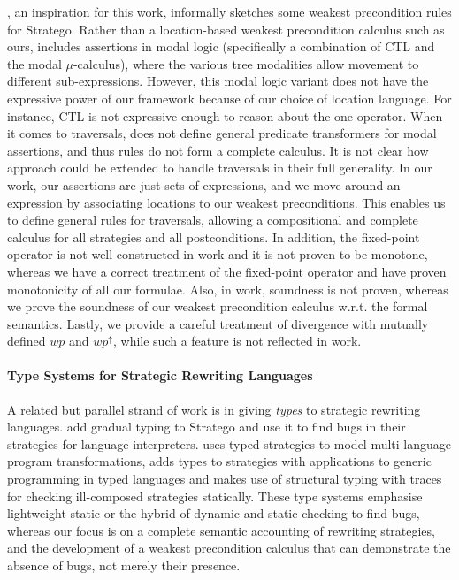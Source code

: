 \citet{KIEBURTZ2001138}, an inspiration for this work, informally sketches some weakest precondition rules for Stratego. Rather than a location-based weakest precondition calculus such as ours, \citet{KIEBURTZ2001138} includes assertions in modal logic (specifically a combination of CTL and the modal $\mu$-calculus), where the various tree modalities allow movement to different sub-expressions.
However, this modal logic variant does not have the expressive power of our framework because of our choice of location language. For instance, CTL is not expressive enough to reason about the one operator. When it comes to traversals, \citet{KIEBURTZ2001138} does not define general predicate transformers for modal assertions, and thus  rules do not form a complete calculus. It is not clear how  approach could be extended to handle traversals in their full generality.
In our work, our assertions are just sets of expressions, and we move around an expression by associating locations to our weakest preconditions. This enables us to define general rules for traversals, allowing a compositional and complete calculus for all strategies and all postconditions.
In addition, the fixed-point operator is not well constructed in  work and it is not proven to be monotone, whereas we have a correct treatment of the fixed-point operator and have proven monotonicity of all our formulae. Also, in  work, soundness is not proven, whereas we prove the soundness of our weakest precondition calculus w.r.t. the formal semantics. Lastly, we provide a careful treatment of divergence with mutually defined $\mathit{wp}$ and $\mathit{wp}^\uparrow$, while such a feature is not reflected in  work.

\paragraph*{Type Systems for Strategic Rewriting Languages} A related but parallel strand of work is in giving \emph{types} to strategic rewriting languages. \citet{DBLP:conf/sle/SmitsV20} add gradual typing to Stratego and use it to find bugs in their strategies for language interpreters. \citet{DBLP:conf/birthday/Koppel23} uses typed strategies to model multi-language program transformations, \citet{DBLP:journals/jlp/Lammel03} adds types to strategies with applications to generic programming in typed languages and \citet{fu2023traced} makes use of structural typing with traces for checking ill-composed strategies statically. These type systems emphasise lightweight static or the hybrid of dynamic and static checking to find bugs, whereas our focus is on a complete semantic accounting of rewriting strategies, and the development of a weakest precondition calculus that can demonstrate the absence of bugs, not merely their presence.

